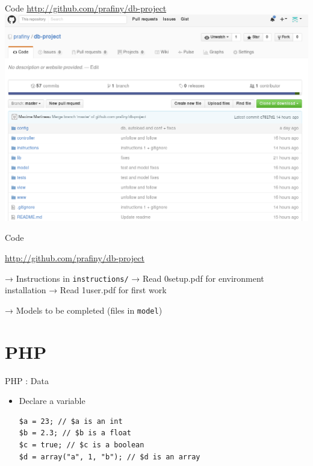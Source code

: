 \documentclass{beamer}
\begin{document}
\begin{frame}{Code}
\center
    \url{http://github.com/prafiny/db-project}
    \includegraphics[scale=0.2]{images/project.png}  
\end{frame}

\begin{frame}{Code}
    \begin{center}
        \url{http://github.com/prafiny/db-project}
    \end{center}
    
→ Instructions in \texttt{instructions/}
	→ Read 0setup.pdf for environment installation
	→ Read 1user.pdf for first work

→ Models to be completed (files in \texttt{model\/})

\end{frame}

\section{PHP}

\begin{frame}[fragile]{PHP : Data}
    \begin{itemize}
        \item Declare a variable
        \begin{lstlisting}
$a = 23; // $a is an int
$b = 2.3; // $b is a float
$c = true; // $c is a boolean
$d = array("a", 1, "b"); // $d is an array
        \end{lstlisting}
    \end{itemize}
\end{frame}
\end{document}
